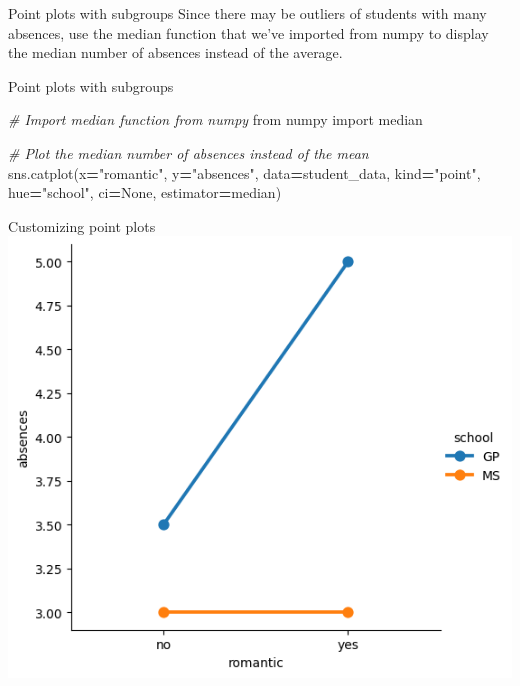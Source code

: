 \documentclass[
  ignorenonframetext,
]{beamer}
\newenvironment{Shaded}{\begin{snugshade}}{\end{snugshade}}
\newcommand{\CommentTok}[1]{\textcolor[rgb]{0.56,0.35,0.01}{\textit{#1}}}
\newcommand{\ImportTok}[1]{#1}
\newcommand{\NormalTok}[1]{#1}
\newcommand{\OperatorTok}[1]{\textcolor[rgb]{0.81,0.36,0.00}{\textbf{#1}}}
\newcommand{\StringTok}[1]{\textcolor[rgb]{0.31,0.60,0.02}{#1}}
\newcommand{\VariableTok}[1]{\textcolor[rgb]{0.00,0.00,0.00}{#1}}
\begin{document}
\begin{frame}{Point plots with subgroups}
\label{point-plots-with-subgroups-8}
Since there may be outliers of students with many absences, use the
median function that we've imported from numpy to display the median
number of absences instead of the average.
\end{frame}

\begin{frame}[fragile]{Point plots with subgroups}
\label{point-plots-with-subgroups-9}

\begin{Shaded}
\begin{Highlighting}[]
\CommentTok{\# Import median function from numpy}
\ImportTok{from}\NormalTok{ numpy }\ImportTok{import}\NormalTok{ median}

\CommentTok{\# Plot the median number of absences instead of the mean}
\NormalTok{sns.catplot(x}\OperatorTok{=}\StringTok{"romantic"}\NormalTok{, y}\OperatorTok{=}\StringTok{"absences"}\NormalTok{,}
\NormalTok{            data}\OperatorTok{=}\NormalTok{student\_data,}
\NormalTok{            kind}\OperatorTok{=}\StringTok{"point"}\NormalTok{,}
\NormalTok{            hue}\OperatorTok{=}\StringTok{"school"}\NormalTok{,}
\NormalTok{            ci}\OperatorTok{=}\VariableTok{None}\NormalTok{,}
\NormalTok{            estimator}\OperatorTok{=}\NormalTok{median)}
\end{Highlighting}
\end{Shaded}
\end{frame}

\begin{frame}{Customizing point plots}
\label{customizing-point-plots-13}
\includegraphics{../images/im295.png}
\end{frame}
\end{document}

